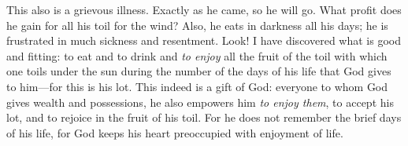 \begin{biblechapter}
\verse This also is a grievous illness. Exactly as he came, so he will go. What profit does he gain for all his toil for the wind?
\verse Also, he eats in darkness all his days; he is frustrated in much sickness and resentment.
 Look! I have discovered what is good and fitting: to eat and to drink and \textit{to enjoy} all the fruit of the toil with which one toils under the sun during the number of the days of his life that God gives to him—for this is his lot.
\verse This indeed is a gift of God: everyone to whom God gives wealth and possessions, he also empowers him \textit{to enjoy them}, to accept his lot, and to rejoice in the fruit of his toil.
\verse For he does not remember the brief days of his life, for God keeps his heart preoccupied with enjoyment of life.
\end{biblechapter}

